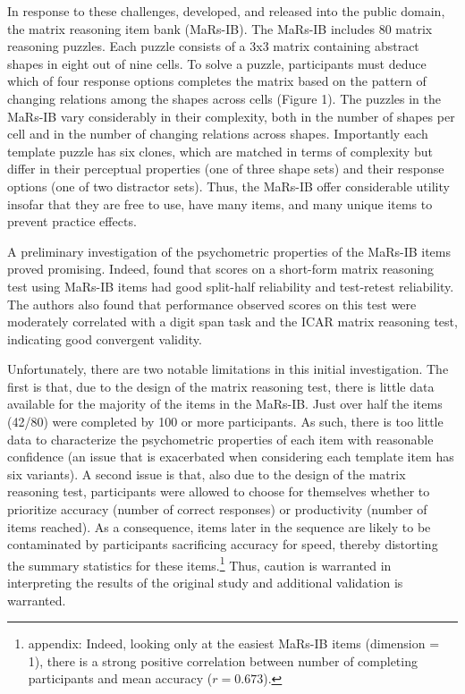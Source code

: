 \documentclass[a4paper,man,natbib]{apa6}
\begin{document}
In response to these challenges, \cite{chierchia2019matrix} developed, and released into the public domain, the matrix reasoning item bank (MaRs-IB). The MaRs-IB includes 80 matrix reasoning puzzles. Each puzzle consists of a 3x3 matrix containing abstract shapes in eight out of nine cells. To solve a puzzle, participants must deduce which of four response options completes the matrix based on the pattern of changing relations among the shapes across cells (Figure 1). The puzzles in the MaRs-IB vary considerably in their complexity, both in the number of shapes per cell and in the number of changing relations across shapes. Importantly each template puzzle has six clones, which are matched in terms of complexity but differ in their perceptual properties (one of three shape sets) and their response options (one of two distractor sets). Thus, the MaRs-IB offer considerable utility insofar that they are free to use, have many items, and many unique items to prevent practice effects.

A preliminary investigation of the psychometric properties of the MaRs-IB items proved promising. Indeed, \cite{chierchia2019matrix} found that scores on a short-form matrix reasoning test using MaRs-IB items had good split-half reliability and test-retest reliability. The authors also found that performance observed scores on this test were moderately correlated with a digit span task and the ICAR matrix reasoning test, indicating good convergent validity. %

Unfortunately, there are two notable limitations in this initial investigation. The first is that, due to the design of the matrix reasoning test, there is little data available for the majority of the items in the MaRs-IB. Just over half the items (42/80) were completed by 100 or more participants. As such, there is too little data to characterize the psychometric properties of each item with reasonable confidence (an issue that is exacerbated when considering each template item has six variants). A second issue is that, also due to the design of the matrix reasoning test, participants were allowed to choose for themselves whether to prioritize accuracy (number of correct responses) or productivity (number of items reached). As a consequence, items later in the sequence are likely to be contaminated by participants sacrificing accuracy for speed, thereby distorting the summary statistics for these items.\footnote{appendix: Indeed, looking only at the easiest MaRs-IB items (dimension = 1), there is a strong positive correlation between number of completing participants and mean accuracy ($r = 0.673$).} Thus, caution is warranted in interpreting the results of the original study and additional validation is warranted.
\end{document}
